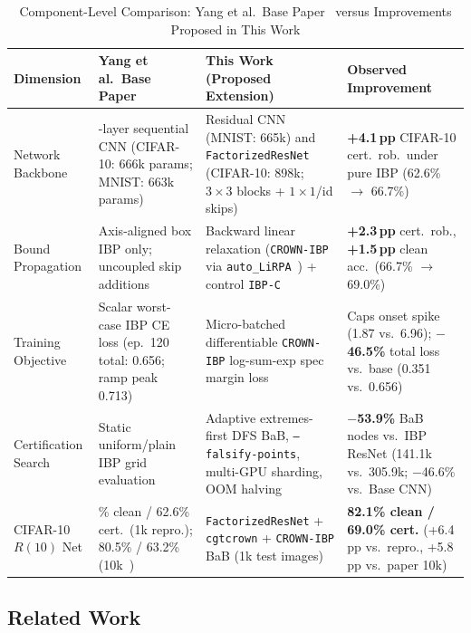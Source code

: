 \documentclass[conference]{IEEEtran}
\begin{document}
\begin{table}[t]
\caption{Component-Level Comparison: Yang et al.\ Base Paper~\cite{b3}
         versus Improvements Proposed in This Work}
\centering
\footnotesize
\setlength{\tabcolsep}{2.6pt}
\renewcommand{\arraystretch}{1.02}
\begin{tabular}{|l|>{\raggedright\arraybackslash}p{4.0cm}|>{\raggedright\arraybackslash}p{5.8cm}|>{\raggedright\arraybackslash}p{4.8cm}|}
\hline
\textbf{Dimension} &
\textbf{Yang et al.\ Base Paper~\cite{b3}} &
\textbf{This Work (Proposed Extension)} &
\textbf{Observed Improvement} \\
\hline
Network Backbone &
3-layer sequential CNN
(CIFAR-10: 666k params; MNIST: 663k params) &
Residual CNN (MNIST: 665k) and
\texttt{FactorizedResNet}
(CIFAR-10: 898k; $3{\times}3$ blocks + $1{\times}1$/id skips) &
\textbf{+4.1\,pp} CIFAR-10 cert.\ rob.\ under pure IBP
(62.6\% $\to$ 66.7\%) \\
\hline
Bound Propagation &
Axis-aligned box IBP only;
uncoupled skip additions &
Backward linear relaxation
(\texttt{CROWN-IBP} via
\texttt{auto\_LiRPA}~\cite{b11})
+ control \texttt{IBP-C} &
\textbf{+2.3\,pp} cert.\ rob.,
\textbf{+1.5\,pp} clean acc.\
(66.7\% $\to$ 69.0\%) \\
\hline
Training Objective &
Scalar worst-case IBP CE loss
(ep.\ 120 total: 0.656;
ramp peak 0.713) &
Micro-batched differentiable
\texttt{CROWN-IBP} log-sum-exp
spec margin loss &
Caps onset spike (1.87 vs.\ 6.96);
\textbf{$-$46.5\%} total loss
vs.\ base (0.351 vs.\ 0.656) \\
\hline
Certification Search &
Static uniform/plain IBP
grid evaluation &
Adaptive extremes-first DFS BaB,
\texttt{--falsify-points},
multi-GPU sharding, OOM halving &
\textbf{$-$53.9\%} BaB nodes vs.\
IBP ResNet (141.1k vs.\ 305.9k;
$-$46.6\% vs.\ Base CNN) \\
\hline
CIFAR-10 $R(10)$ Net &
79.8\% clean / 62.6\% cert.\ (1k repro.);
80.5\% / 63.2\% (10k~\cite{b3}) &
\texttt{FactorizedResNet} +
\texttt{cgtcrown} +
\texttt{CROWN-IBP} BaB (1k test images) &
\textbf{82.1\% clean / 69.0\% cert.}
(+6.4\,pp vs.\ repro.,
+5.8\,pp vs.\ paper 10k) \\
\hline
\end{tabular}
\label{tab:base_vs_ours}
\end{table}

\subsection{Related Work}
\end{document}
